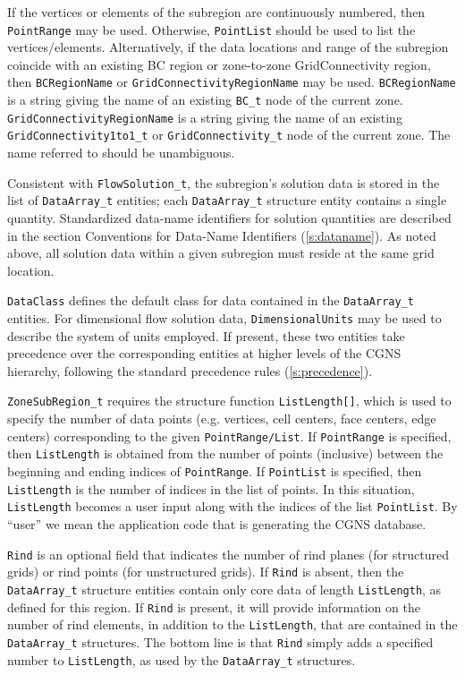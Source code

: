 If the vertices or elements of the subregion are continuously numbered,
then \texttt{PointRange} may be used. Otherwise, \texttt{PointList}
should be used to list the vertices/elements. Alternatively, if
the data locations and range of the subregion coincide with an existing
BC region or zone-to-zone GridConnectivity region, then \texttt{BCRegionName}
or \texttt{GridConnectivityRegionName} may be used.
\texttt{BCRegionName} is a string giving the name of an existing
\texttt{BC\_t} node of the current zone.
\texttt{GridConnectivityRegionName} is a string giving the name of an existing
\texttt{GridConnectivity1to1\_t}
or \texttt{GridConnectivity\_t}
node of the current zone.
The name referred to should be unambiguous.

Consistent with \texttt{FlowSolution\_t},
the subregion's solution data is stored in the list of
\texttt{DataArray\_t} entities;
each \texttt{DataArray\_t} structure entity contains a single quantity.
Standardized data-name identifiers for solution quantities are described
in the section Conventions for Data-Name Identifiers (\autoref{s:dataname}).
As noted above, all solution data
within a given subregion must reside at the same grid location.

\texttt{DataClass} defines the default class
for data contained in the \texttt{DataArray\_t} entities. For dimensional
flow solution data, \texttt{DimensionalUnits}
may be used to describe the system of units employed. If present, these two entities
take precedence over the corresponding entities at higher levels of the
CGNS hierarchy, following the standard precedence rules (\autoref{s:precedence}).

\texttt{ZoneSubRegion\_t} requires the structure function
\texttt{ListLength[]},
which is used to specify the number
of data points (e.g. vertices, cell centers, face centers, edge centers)
corresponding to the given \texttt{PointRange/List}.
If \texttt{PointRange} is specified, then \texttt{ListLength} is obtained
from the number of points (inclusive) between the beginning and ending indices
of \texttt{PointRange}. If \texttt{PointList} is specified,
then \texttt{ListLength} is the number of indices in the list of points.
In this situation, \texttt{ListLength} becomes a user input along with the
indices of the list \texttt{PointList}. By ``user'' we mean the application
code that is generating the CGNS database.

\texttt{Rind} is an optional field that indicates the
number of rind planes (for structured grids) or rind points (for unstructured grids).
If \texttt{Rind} is absent, then the \texttt{DataArray\_t} structure entities contain
only core data of length \texttt{ListLength}, as defined for this region.
If \texttt{Rind} is present, it will provide information on the number of
rind elements, in addition to the \texttt{ListLength}, that are contained
in the \texttt{DataArray\_t} structures. The bottom line is that \texttt{Rind}
simply adds a specified number to \texttt{ListLength},
as used by the \texttt{DataArray\_t} structures.

